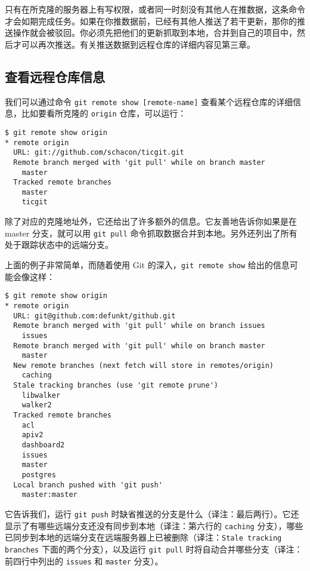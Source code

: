 \documentclass[a4paper]{book}
\begin{document}
只有在所克隆的服务器上有写权限，或者同一时刻没有其他人在推数据，这条命令才会如期完成任务。如果在你推数据前，已经有其他人推送了若干更新，那你的推送操作就会被驳回。你必须先把他们的更新抓取到本地，合并到自己的项目中，然后才可以再次推送。有关推送数据到远程仓库的详细内容见第三章。

\subsection{查看远程仓库信息}

我们可以通过命令 \texttt{git remote show {[}remote-name{]}} 查看某个远程仓库的详细信息，比如要看所克隆的 \texttt{origin} 仓库，可以运行：

\begin{shaded}\begin{verbatim}
$ git remote show origin
* remote origin
  URL: git://github.com/schacon/ticgit.git
  Remote branch merged with 'git pull' while on branch master
    master
  Tracked remote branches
    master
    ticgit
\end{verbatim}\end{shaded}

除了对应的克隆地址外，它还给出了许多额外的信息。它友善地告诉你如果是在 master 分支，就可以用 \texttt{git pull} 命令抓取数据合并到本地。另外还列出了所有处于跟踪状态中的远端分支。

上面的例子非常简单，而随着使用 Git 的深入，\texttt{git remote show} 给出的信息可能会像这样：

\begin{shaded}\begin{verbatim}
$ git remote show origin
* remote origin
  URL: git@github.com:defunkt/github.git
  Remote branch merged with 'git pull' while on branch issues
    issues
  Remote branch merged with 'git pull' while on branch master
    master
  New remote branches (next fetch will store in remotes/origin)
    caching
  Stale tracking branches (use 'git remote prune')
    libwalker
    walker2
  Tracked remote branches
    acl
    apiv2
    dashboard2
    issues
    master
    postgres
  Local branch pushed with 'git push'
    master:master
\end{verbatim}\end{shaded}

它告诉我们，运行 \texttt{git push} 时缺省推送的分支是什么（译注：最后两行）。它还显示了有哪些远端分支还没有同步到本地（译注：第六行的 \texttt{caching} 分支），哪些已同步到本地的远端分支在远端服务器上已被删除（译注：\texttt{Stale tracking branches} 下面的两个分支），以及运行 \texttt{git pull} 时将自动合并哪些分支（译注：前四行中列出的 \texttt{issues} 和 \texttt{master} 分支）。
\end{document}
